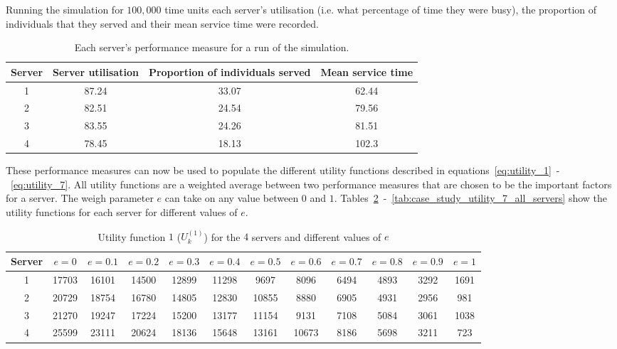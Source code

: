 Running the simulation for \(100,000\) time units each server's utilisation
(i.e. what percentage of time they were busy), the proportion of individuals
that they served and their mean service time were recorded.

\begin{table}[H]
    \caption{Each server's performance measure for a run of the simulation.}
    \label{tab:case_study_server_metrics}
    \small
    \begin{tabular}{|c|c|c|c|}
        \hline
        Server & Server utilisation & Proportion of individuals served &
        Mean service time \\
        \hline
        1 & 87.24 & 33.07 & 62.44 \\
        2 & 82.51 & 24.54 & 79.56 \\
        3 & 83.55 & 24.26 & 81.51 \\
        4 & 78.45 & 18.13 & 102.3 \\
        \hline
    \end{tabular}
\end{table}

These performance measures can now be used to populate the different utility
functions described in equations~\eqref{eq:utility_1}~-~\eqref{eq:utility_7}.
All utility functions are a weighted average between two performance measures
that are chosen to be the important factors for a server.
The weigh parameter \(e\) can take on any value between \(0\) and \(1\).
Tables~\ref{tab:case_study_utility_1_all_servers}~-~\ref{tab:case_study_utility_7_all_servers}
show the utility functions for each server for different values of \(e\).

\begin{table}[H]
    \caption{Utility function \(1\) (\(U_k^{(1)}\)) for the \(4\) servers and
    different values of \(e\)}
    \label{tab:case_study_utility_1_all_servers}
    \begin{adjustbox}{width=\columnwidth,center}
        \begin{tabular}{|c|c|c|c|c|c|c|c|c|c|c|c|}
            \hline
            Server & \(e = 0\) & \(e = 0.1\) & \(e = 0.2\) & \(e = 0.3\)
                   & \(e = 0.4\) & \(e = 0.5\) & \(e = 0.6\) & \(e = 0.7\)
                   & \(e = 0.8\) & \(e = 0.9\) & \(e = 1\) \\
            \hline
            1 & 17703 & 16101 &	14500 & 12899 & 11298 & 9697 & 8096 & 6494
                & 4893 & 3292 & 1691 \\
            2 & 20729 & 18754 &	16780 & 14805 & 12830 & 10855 & 8880 & 6905
                & 4931 & 2956 & 981 \\
            3 & 21270 & 19247 & 17224 & 15200 & 13177 & 11154 & 9131 & 7108
                & 5084 & 3061 & 1038 \\
            4 & 25599 & 23111 &	20624 & 18136 & 15648 & 13161 & 10673 & 8186
                & 5698 & 3211 & 723 \\
            \hline
        \end{tabular}
    \end{adjustbox}
\end{table}


